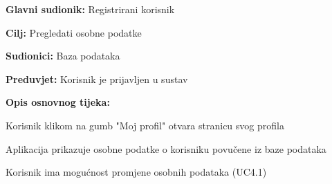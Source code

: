 					\noindent {}
					\begin{packed_item}
						
						\item \textbf{Glavni sudionik: } Registrirani korisnik
						\item  \textbf{Cilj:} Pregledati osobne podatke
						\item  \textbf{Sudionici:} Baza podataka
						\item  \textbf{Preduvjet:} Korisnik je prijavljen u sustav
						\item  \textbf{Opis osnovnog tijeka:}
						
						\item[] \begin{packed_enum}
							
							\item Korisnik klikom na gumb "Moj profil" otvara stranicu svog profila
							\item Aplikacija prikazuje osobne podatke o korisniku povučene iz baze podataka
							\item Korisnik ima mogućnost promjene osobnih podataka (UC4.1)
							
						\end{packed_enum}
						
					\end{packed_item}
					\noindent {}
